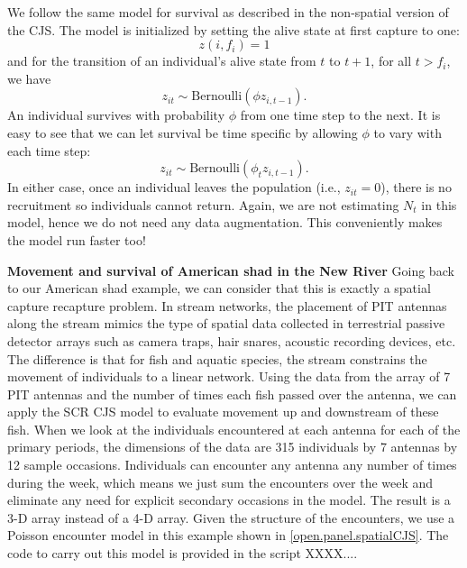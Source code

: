 We follow the same model for survival as described in the non-spatial version of the
CJS.  The model is initialized by setting the alive
state at first capture to one:
\[
 z(i,f_i) = 1
\]
and for the transition of an individual's alive state from $t$ to $t+1$, for
all $t > f_i$, we have
\[
z_{it} \sim \mbox{Bernoulli}( \phi z_{i,t-1}).
\]
An individual survives with probability
$\phi$ from one time step to the next.  It is easy to see that we can let
survival be time specific by allowing $\phi$ to vary with each time step:
\[
 z_{it} \sim \mbox{Bernoulli}( \phi_t z_{i,t-1}).
\]
In either case, once an individual leaves the
population (i.e., $z_{it} = 0$), there is no recruitment so individuals cannot
return.  Again, we are not estimating $N_t$ in this model, hence we do not need
any data augmentation.  This conveniently makes the model run
faster too!



{\flushleft \bf Movement and survival of American shad in the New River}
Going back to our American shad example, we can consider that this is
exactly a spatial capture recapture problem.  In stream networks, the
placement of PIT antennas along the stream mimics the type of spatial
data collected in terrestrial passive detector arrays such as camera
traps, hair snares, acoustic recording devices, etc.  The difference
is that for fish and aquatic species, the stream constrains the
movement of individuals to a linear network.  Using the data from the
array of 7 PIT antennas and the number of times each fish passed over
the antenna, we can apply the SCR CJS model to evaluate movement up
and downstream of these fish.  When we look at the individuals
encountered at each antenna for each of the primary periods, the
dimensions of the data are 315 individuals by 7 antennas by 12 sample
occasions. Individuals can encounter any antenna any number of times
during the week, which means we just sum the encounters over the week
and eliminate any need for explicit secondary occasions in the
model. The result is a 3-D array instead of a 4-D array.  Given the
structure of the encounters, we use a Poisson encounter model in this
example shown in \ref{open.panel.spatialCJS}.  The code to carry out this
model is provided in the script XXXX....



